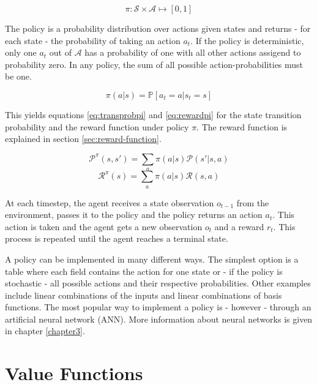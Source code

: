 \begin{equation}
\pi: \mathcal{S} \times \mathcal{A} \mapsto [0,1]
\end{equation} 

The policy is a probability distribution over actions given states and returns - for each state - the probability of taking an action $a_t$. If the policy is deterministic, only one $a_t$ out of $\mathcal{A}$ has a probability of one with all other actions assigend to probability zero. In any policy, the sum of all possible action-probabilities must be one.

\begin{equation}
\pi(a|s) = \mathbb{P}[a_t=a|s_t=s]
\end{equation}

This yields equations \ref{eq:transprobpi} and \ref{eq:rewardpi} for the state transition probability and the reward function under policy $\pi$. The reward function is explained in section \ref{sec:reward-function}.

\begin{equation}
\mathcal{P}^\pi(s,s')=\sum_a \pi(a|s)\mathcal{P}(s'|s,a)
\label{eq:transprobpi}
\end{equation}
\begin{equation}
\mathcal{R}^\pi(s) = \sum_a\pi(a|s)\mathcal{R}(s,a)
\label{eq:rewardpi}
\end{equation}

At each timestep, the agent receives a state observation $o_{t-1}$ from the environment, passes it to the policy and the policy returns an action $a_t$. This action is taken and the agent gets a new observation $o_t$ and a reward $r_t$. This process is repeated until the agent reaches a terminal state.

A policy can be implemented in many different ways. The simplest option is a table where each field contains the action for one state or - if the policy is stochastic - all possible actions and their respective probabilities. Other examples include linear combinations of the inputs and linear combinations of basis functions. The most popular way to implement a policy is - however - through an artificial neural network (ANN). More information about neural networks is given in chapter \ref{chapter3}.  

\section{Value Functions}
\label{sec:value-function}

